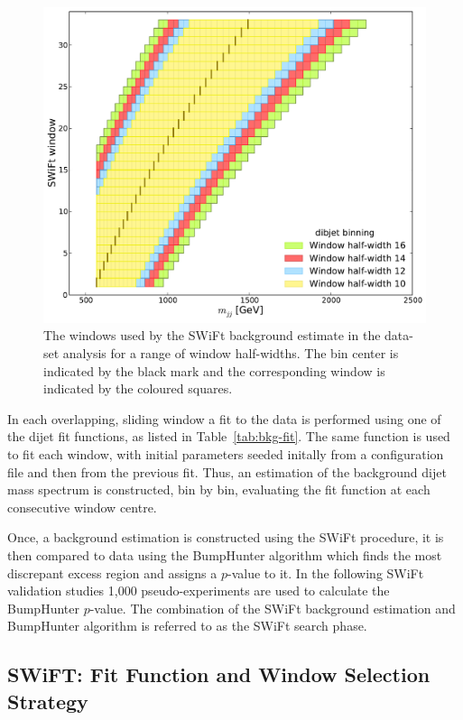 \begin{figure}[!htb]
\centering
\includegraphics[width=0.6\linewidth, angle=0]{figs/Dibjet/LowMass/evt-swiftBins_min566_fl0_fh0_tr0.pdf}
\caption{\label{fig:bkg-lm_swiftBins}
  The windows used by the SWiFt background estimate in the \lm{} data-set analysis for a range of window half-widths.
  The bin center is indicated by the black mark and the corresponding window is indicated by the coloured squares.}
\end{figure}

In each overlapping, sliding window a fit to the data is performed using one of the dijet fit functions, as listed in Table~\ref{tab:bkg-fit}.
The same function is used to fit each window,
with initial parameters seeded initally from a configuration file and then from the previous fit.
Thus, an estimation of the background dijet mass spectrum is constructed, bin by bin,
evaluating the fit function at each consecutive window centre.

Once, a background estimation is constructed using the SWiFt procedure,
it is then compared to data using the {\sc BumpHunter} algorithm which finds the most discrepant excess region and assigns a \mbox{$p$-value} to it.
In the following SWiFt validation studies 1,000 pseudo-experiments are used to calculate the {\sc BumpHunter} \mbox{$p$-value}.
The combination of the SWiFt background estimation and {\sc BumpHunter} algorithm is referred to as the SWiFt search phase.

\subsection{SWiFT: Fit Function and Window Selection Strategy}
\label{sec:windowSel}

